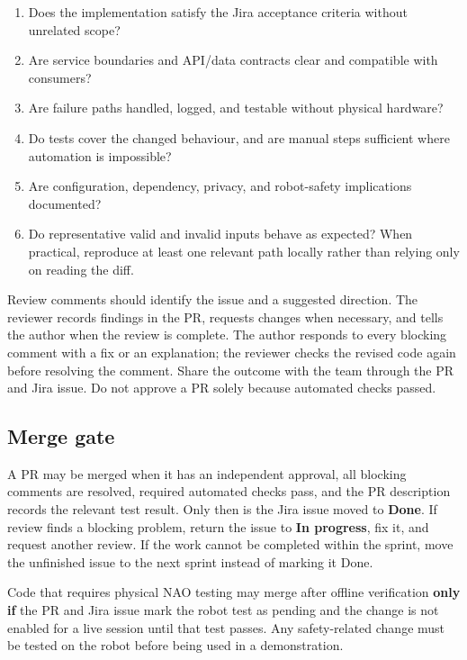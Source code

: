 \documentclass[12pt,a4paper]{article}
\begin{document}
\begin{enumerate}

\item Does the implementation satisfy the Jira acceptance criteria without unrelated scope?

\item Are service boundaries and API/data contracts clear and compatible with consumers?

\item Are failure paths handled, logged, and testable without physical hardware?

\item Do tests cover the changed behaviour, and are manual steps sufficient where automation is impossible?

\item Are configuration, dependency, privacy, and robot-safety implications documented?

\item Do representative valid and invalid inputs behave as expected? When practical, reproduce at least one relevant path locally rather than relying only on reading the diff.

\end{enumerate}

Review comments should identify the issue and a suggested direction. The reviewer records findings in the PR, requests changes when necessary, and tells the author when the review is complete. The author responds to every blocking comment with a fix or an explanation; the reviewer checks the revised code again before resolving the comment. Share the outcome with the team through the PR and Jira issue. Do not approve a PR solely because automated checks passed.

\subsection{Merge gate}

A PR may be merged when it has an independent approval, all blocking comments are resolved, required automated checks pass, and the PR description records the relevant test result. Only then is the Jira issue moved to \textbf{Done}. If review finds a blocking problem, return the issue to \textbf{In progress}, fix it, and request another review. If the work cannot be completed within the sprint, move the unfinished issue to the next sprint instead of marking it Done.

Code that requires physical NAO testing may merge after offline verification \textbf{only if} the PR and Jira issue mark the robot test as pending and the change is not enabled for a live session until that test passes. Any safety-related change must be tested on the robot before being used in a demonstration.
\end{document}
